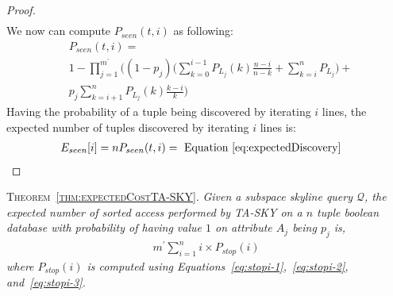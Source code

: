 \begin{proof}
\begin{align}
\end{align}
We now can compute $P_{seen}(t,i)$ as following:
\begin{align}
\nonumber
&P_{seen}(t,i) = \\
&1 - \prod_{j=1}^{m^\prime} \bigg( (1 - p_j) \Big(\sum_{k=0}^{i-1}P_{L_j}(k)\frac{n-i}{n-k} + \sum_{k=i}^{n}P_{L_j} \Big) +\\ \nonumber &p_j\sum_{k=i+1}^n P_{L_j}(k) \frac{k-i}{k} \bigg)
\end{align}
Having the probability of a tuple being discovered by iterating $i$ lines, the expected number of tuples discovered by iterating $i$ lines is:
\begin{align}
\nonumber
&E_{seen}[i] = n P_{seen}(t,i) = \mbox{ Equation~\ref{eq:expectedDiscovery}}
\end{align}
\end{proof}




\textsc{Theorem~\ref{thm:expectedCostTA-SKY}.} {\em
Given a subspace skyline query $\mathcal{Q}$, the expected number of sorted access performed by TA-SKY on a $n$ tuple boolean database with probability of having value $1$ on attribute $A_j$ being $p_j$ is,
\begin{align*}
m^\prime \sum_{i=1}^n i\times P_{stop}(i)
\end{align*}
where $P_{stop}(i)$ is computed using Equations~\ref{eq:stopi-1},~\ref{eq:stopi-2}, and~\ref{eq:stopi-3}.
}

